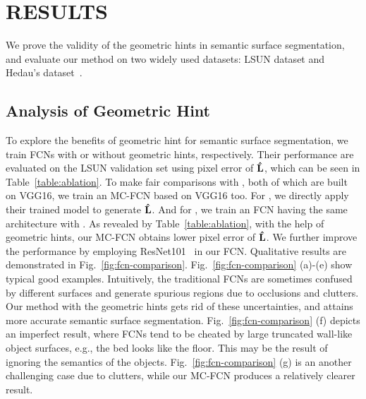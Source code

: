 \section{RESULTS}
\label{sec:Res}

We prove the validity of the geometric hints in semantic surface segmentation, and evaluate our method on two widely used datasets: LSUN dataset \cite{zhang2015large} and Hedau's dataset~\cite{hedau2009recovering}. 

\subsection{Analysis of Geometric Hint}
\label{sec:ablation}
To explore the benefits of geometric hint for semantic surface segmentation, we train FCNs with or without geometric hints, respectively. 
Their performance are evaluated on the LSUN validation set using pixel error of $\mathbf{\hat{L}}$, which can be seen in Table~\ref{table:ablation}. To make fair comparisons with \cite{ren2016coarse, dasgupta2016delay}, both of which are built on VGG16, we train an MC-FCN based on VGG16 too. For \cite{ren2016coarse}, we directly apply their trained model to generate $\mathbf{\hat{L}}$. And for \cite{dasgupta2016delay}, we train an FCN having the same architecture with \cite{dasgupta2016delay}. As revealed by Table~\ref{table:ablation}, with the help of geometric hints, our MC-FCN obtains lower pixel error of $\mathbf{\hat{L}}$. We further improve the performance by employing ResNet101~\cite{he2016deep} in our FCN. 
Qualitative results are demonstrated in Fig.~\ref{fig:fcn-comparison}. 
Fig.~\ref{fig:fcn-comparison} (a)-(e) show typical good examples. Intuitively, the traditional FCNs are sometimes confused by different surfaces and generate spurious regions due to occlusions and clutters. 
Our method with the geometric hints gets rid of these uncertainties, and attains more accurate semantic surface segmentation. Fig.~\ref{fig:fcn-comparison} (f) depicts an imperfect result, where FCNs tend to be cheated by large truncated wall-like object surfaces, e.g., the bed looks like the floor. This may be the result of ignoring the semantics of the objects. Fig.~\ref{fig:fcn-comparison} (g) is an another challenging case due to clutters, while our MC-FCN produces a relatively clearer result.  

